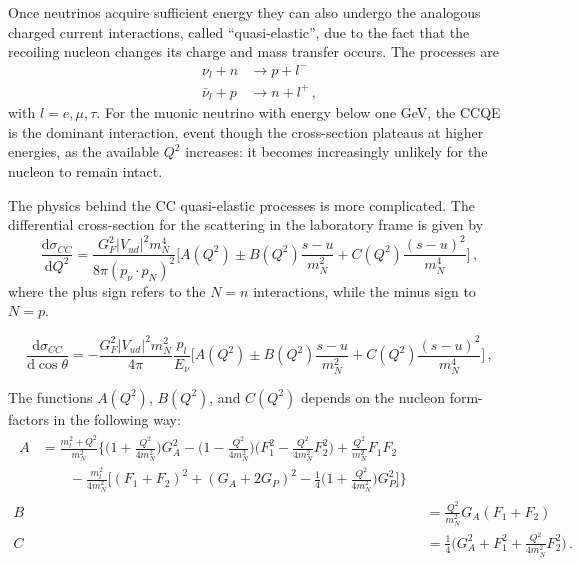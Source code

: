 Once neutrinos acquire sufficient energy they can also undergo the analogous charged current interactions, %
called ``quasi-elastic'', due to the fact that the recoiling nucleon changes its charge and mass transfer occurs.
The processes are
\begin{align}
	\nu_l + n &\rightarrow p + l^-\,\\
	\bar\nu_l + p &\rightarrow n + l^+\,,
\end{align}
with $l=e, \mu, \tau$.
For the muonic neutrino with energy below one GeV, the CCQE is the dominant interaction, event though the %
cross-section plateaus at higher energies, as the available $Q^2$ increases: it becomes increasingly unlikely %
for the nucleon to remain intact.

The physics behind the CC quasi-elastic processes is more complicated.
The differential cross-section for the scattering in the laboratory frame is given by
\begin{equation}
	\label{eq:cc_xsec_q}
	\frac{\mathrm{d} \sigma_{CC}}{\mathrm{d}Q^2} = \frac{G_F^2 |V_{ud}|^2 m_N^4}{8\pi (p_\nu \cdot p_N)^2} %
	\bigg [A(Q^2) \pm B(Q^2) \frac{s-u}{m_N^2} + C(Q^2) \frac{(s-u)^2}{m_N^4} \bigg]\,,
\end{equation}
where the plus sign refers to the $N = n$ interactions, while the minus sign to $N = p$.

\begin{equation}
	\label{eq:cc_xsec_t}
	\frac{\mathrm{d} \sigma_{CC}}{\mathrm{d}\cos\theta} = -\frac{G_F^2 |V_{ud}|^2 m_N^2}{4\pi} \frac{p_l}{E_\nu} %
	\bigg [A(Q^2) \pm B(Q^2) \frac{s-u}{m_N^2} + C(Q^2) \frac{(s-u)^2}{m_N^4} \bigg]\,,
\end{equation}

The functions $A(Q^2)$, $B(Q^2)$, and $C(Q^2)$ depends on the nucleon form-factors in the following way:
\begin{align}
	\begin{split}
		\label{eq:A(Q)}
		A &= \frac{m_l^2+Q^2}{m_N^2} \bigg\{ \bigg(1+\frac{Q^2}{4m_N^2}\bigg) G_A^2 - \bigg(1-\frac{Q^2}{4m_N^2}\bigg) %
		\bigg(F_1^2 - \frac{Q^2}{4m_N^2}F_2^2 \bigg) +\frac{Q^2}{m_N^2} F_1 F_2 \\
		&\qquad- \frac{m_l^2}{4m_N^2} %
		\bigg[ (F_1+F_2)^2+(G_A+2G_P)^2-\frac{1}{4}\bigg(1+\frac{Q^2}{4m_N^2}\bigg) G_P^2 \bigg] \bigg\}\, 
	\end{split}\\
	\label{eq:B(Q)}
	B &= \frac{Q^2}{m_N^2} G_A (F_1+F_2)\,\\
	\label{eq:C(Q)}
	C &= \frac{1}{4} \big (G_A^2 +F_1^2+\frac{Q^2}{4m_N^2}F_2^2\big)\,.
\end{align}

